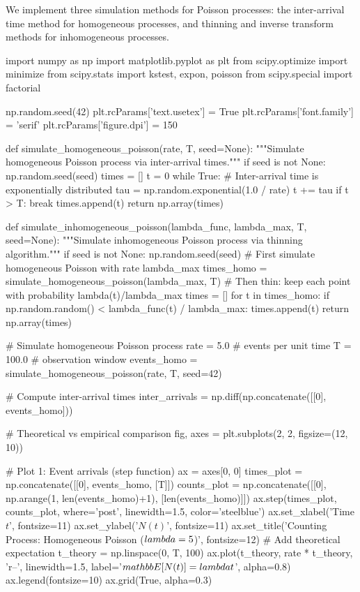 \documentclass[a4paper, 11pt]{article}
\begin{document}
We implement three simulation methods for Poisson processes: the inter-arrival time
method for homogeneous processes, and thinning and inverse transform methods for
inhomogeneous processes.

\begin{pycode}
import numpy as np
import matplotlib.pyplot as plt
from scipy.optimize import minimize
from scipy.stats import kstest, expon, poisson
from scipy.special import factorial

np.random.seed(42)
plt.rcParams['text.usetex'] = True
plt.rcParams['font.family'] = 'serif'
plt.rcParams['figure.dpi'] = 150

def simulate_homogeneous_poisson(rate, T, seed=None):
    """Simulate homogeneous Poisson process via inter-arrival times."""
    if seed is not None:
        np.random.seed(seed)
    times = []
    t = 0
    while True:
        # Inter-arrival time is exponentially distributed
        tau = np.random.exponential(1.0 / rate)
        t += tau
        if t > T:
            break
        times.append(t)
    return np.array(times)

def simulate_inhomogeneous_poisson(lambda_func, lambda_max, T, seed=None):
    """Simulate inhomogeneous Poisson process via thinning algorithm."""
    if seed is not None:
        np.random.seed(seed)
    # First simulate homogeneous Poisson with rate lambda_max
    times_homo = simulate_homogeneous_poisson(lambda_max, T)
    # Then thin: keep each point with probability lambda(t)/lambda_max
    times = []
    for t in times_homo:
        if np.random.random() < lambda_func(t) / lambda_max:
            times.append(t)
    return np.array(times)

# Simulate homogeneous Poisson process
rate = 5.0  # events per unit time
T = 100.0   # observation window
events_homo = simulate_homogeneous_poisson(rate, T, seed=42)

# Compute inter-arrival times
inter_arrivals = np.diff(np.concatenate([[0], events_homo]))

# Theoretical vs empirical comparison
fig, axes = plt.subplots(2, 2, figsize=(12, 10))

# Plot 1: Event arrivals (step function)
ax = axes[0, 0]
times_plot = np.concatenate([[0], events_homo, [T]])
counts_plot = np.concatenate([[0], np.arange(1, len(events_homo)+1), [len(events_homo)]])
ax.step(times_plot, counts_plot, where='post', linewidth=1.5, color='steelblue')
ax.set_xlabel('Time $t$', fontsize=11)
ax.set_ylabel('$N(t)$', fontsize=11)
ax.set_title('Counting Process: Homogeneous Poisson ($\\lambda = 5$)', fontsize=12)
# Add theoretical expectation
t_theory = np.linspace(0, T, 100)
ax.plot(t_theory, rate * t_theory, 'r--', linewidth=1.5,
        label='$\\mathbb{E}[N(t)] = \\lambda t$', alpha=0.8)
ax.legend(fontsize=10)
ax.grid(True, alpha=0.3)


\end{pycode}
\end{document}
